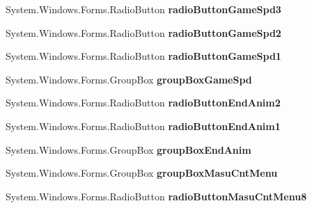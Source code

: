 \begin{DoxyCompactItemize}
System.\+Windows.\+Forms.\+Radio\+Button {\bfseries radio\+Button\+Game\+Spd3}
\item 
\mbox{\label{class_reversi_form_1_1_setting_form_a2b1d5593272965d9ac73f67ab3223078}} 
System.\+Windows.\+Forms.\+Radio\+Button {\bfseries radio\+Button\+Game\+Spd2}
\item 
\mbox{\label{class_reversi_form_1_1_setting_form_a2e94950ab0288d14d1253e1dc935ba5e}} 
System.\+Windows.\+Forms.\+Radio\+Button {\bfseries radio\+Button\+Game\+Spd1}
\item 
\mbox{\label{class_reversi_form_1_1_setting_form_a9f62ef2189eb0097d7b6e7e30bc385ad}} 
System.\+Windows.\+Forms.\+Group\+Box {\bfseries group\+Box\+Game\+Spd}
\item 
\mbox{\label{class_reversi_form_1_1_setting_form_acbb1618716e5ebb03be952fa2375f1e1}} 
System.\+Windows.\+Forms.\+Radio\+Button {\bfseries radio\+Button\+End\+Anim2}
\item 
\mbox{\label{class_reversi_form_1_1_setting_form_a392f35ec4174c8c279f737a6813d2be6}} 
System.\+Windows.\+Forms.\+Radio\+Button {\bfseries radio\+Button\+End\+Anim1}
\item 
\mbox{\label{class_reversi_form_1_1_setting_form_a0c28f90360caafdcb2fbf2a457b9595f}} 
System.\+Windows.\+Forms.\+Group\+Box {\bfseries group\+Box\+End\+Anim}
\item 
\mbox{\label{class_reversi_form_1_1_setting_form_a41637cfbd235ff577ae98877d170d019}} 
System.\+Windows.\+Forms.\+Group\+Box {\bfseries group\+Box\+Masu\+Cnt\+Menu}
\item 
\mbox{\label{class_reversi_form_1_1_setting_form_a2111aa372b7a9c45b1f2d3f01126f29a}} 
System.\+Windows.\+Forms.\+Radio\+Button {\bfseries radio\+Button\+Masu\+Cnt\+Menu8}
\item 
\mbox{\label{class_reversi_form_1_1_setting_form_ab7e0322900df8de23779328650ba08cc}} 

\end{DoxyCompactItemize}
